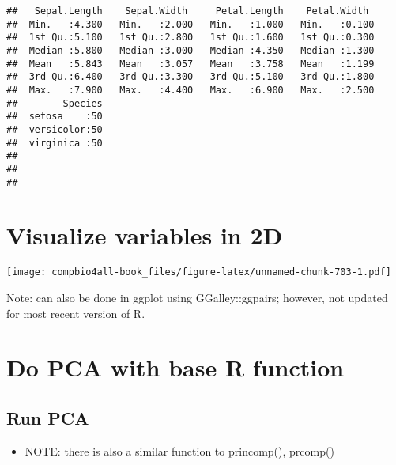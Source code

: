 \documentclass[
]{book}
\newenvironment{Shaded}{\begin{snugshade}}{\end{snugshade}}
\newcommand{\AttributeTok}[1]{\textcolor[rgb]{0.77,0.63,0.00}{#1}}
\newcommand{\ConstantTok}[1]{\textcolor[rgb]{0.00,0.00,0.00}{#1}}
\newcommand{\FunctionTok}[1]{\textcolor[rgb]{0.00,0.00,0.00}{#1}}
\newcommand{\NormalTok}[1]{#1}
\newcommand{\SpecialCharTok}[1]{\textcolor[rgb]{0.00,0.00,0.00}{#1}}
\providecommand{\tightlist}{%
  \setlength{\itemsep}{0pt}\setlength{\parskip}{0pt}}
\begin{document}
\begin{verbatim}
##   Sepal.Length    Sepal.Width     Petal.Length    Petal.Width   
##  Min.   :4.300   Min.   :2.000   Min.   :1.000   Min.   :0.100  
##  1st Qu.:5.100   1st Qu.:2.800   1st Qu.:1.600   1st Qu.:0.300  
##  Median :5.800   Median :3.000   Median :4.350   Median :1.300  
##  Mean   :5.843   Mean   :3.057   Mean   :3.758   Mean   :1.199  
##  3rd Qu.:6.400   3rd Qu.:3.300   3rd Qu.:5.100   3rd Qu.:1.800  
##  Max.   :7.900   Max.   :4.400   Max.   :6.900   Max.   :2.500  
##        Species  
##  setosa    :50  
##  versicolor:50  
##  virginica :50  
##                 
##                 
## 
\end{verbatim}

\hypertarget{visualize-variables-in-2d}{%
\chapter{Visualize variables in 2D}\label{visualize-variables-in-2d}}

\begin{Shaded}
\end{Shaded}

\texttt{[image: compbio4all-book\_files/figure-latex/unnamed-chunk-703-1.pdf]}

Note: can also be done in ggplot using GGalley::ggpairs; however, not updated for most recent version of R.

\hypertarget{do-pca-with-base-r-function}{%
\chapter{Do PCA with base R function}\label{do-pca-with-base-r-function}}

\hypertarget{run-pca-1}{%
\section{Run PCA}\label{run-pca-1}}

\begin{itemize}
\tightlist
\item
  NOTE: there is also a similar function to princomp(), prcomp()
\end{itemize}
\end{document}
